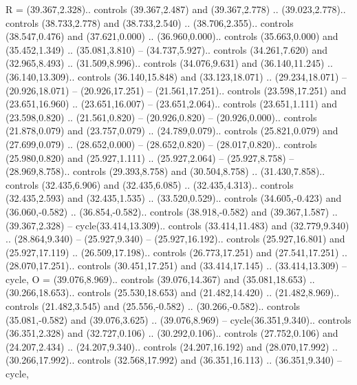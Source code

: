 {R} = {(39.367,2.328).. controls (39.367,2.487) and (39.367,2.778) .. (39.023,2.778).. controls (38.733,2.778) and (38.733,2.540) .. (38.706,2.355).. controls (38.547,0.476) and (37.621,0.000) .. (36.960,0.000).. controls (35.663,0.000) and (35.452,1.349) .. (35.081,3.810) -- (34.737,5.927).. controls (34.261,7.620) and (32.965,8.493) .. (31.509,8.996).. controls (34.076,9.631) and (36.140,11.245) .. (36.140,13.309).. controls (36.140,15.848) and (33.123,18.071) .. (29.234,18.071) -- (20.926,18.071) -- (20.926,17.251) -- (21.561,17.251).. controls (23.598,17.251) and (23.651,16.960) .. (23.651,16.007) -- (23.651,2.064).. controls (23.651,1.111) and (23.598,0.820) .. (21.561,0.820) -- (20.926,0.820) -- (20.926,0.000).. controls (21.878,0.079) and (23.757,0.079) .. (24.789,0.079).. controls (25.821,0.079) and (27.699,0.079) .. (28.652,0.000) -- (28.652,0.820) -- (28.017,0.820).. controls (25.980,0.820) and (25.927,1.111) .. (25.927,2.064) -- (25.927,8.758) -- (28.969,8.758).. controls (29.393,8.758) and (30.504,8.758) .. (31.430,7.858).. controls (32.435,6.906) and (32.435,6.085) .. (32.435,4.313).. controls (32.435,2.593) and (32.435,1.535) .. (33.520,0.529).. controls (34.605,-0.423) and (36.060,-0.582) .. (36.854,-0.582).. controls (38.918,-0.582) and (39.367,1.587) .. (39.367,2.328) -- cycle(33.414,13.309).. controls (33.414,11.483) and (32.779,9.340) .. (28.864,9.340) -- (25.927,9.340) -- (25.927,16.192).. controls (25.927,16.801) and (25.927,17.119) .. (26.509,17.198).. controls (26.773,17.251) and (27.541,17.251) .. (28.070,17.251).. controls (30.451,17.251) and (33.414,17.145) .. (33.414,13.309) -- cycle},
{O} = {(39.076,8.969).. controls (39.076,14.367) and (35.081,18.653) .. (30.266,18.653).. controls (25.530,18.653) and (21.482,14.420) .. (21.482,8.969).. controls (21.482,3.545) and (25.556,-0.582) .. (30.266,-0.582).. controls (35.081,-0.582) and (39.076,3.625) .. (39.076,8.969) -- cycle(36.351,9.340).. controls (36.351,2.328) and (32.727,0.106) .. (30.292,0.106).. controls (27.752,0.106) and (24.207,2.434) .. (24.207,9.340).. controls (24.207,16.192) and (28.070,17.992) .. (30.266,17.992).. controls (32.568,17.992) and (36.351,16.113) .. (36.351,9.340) -- cycle},
